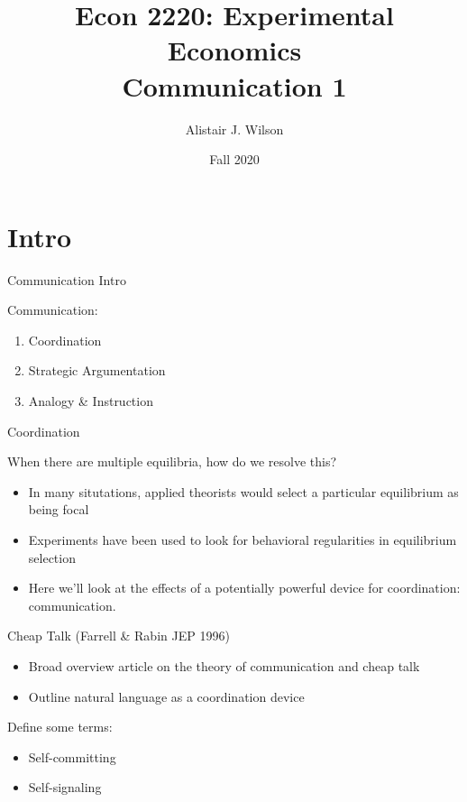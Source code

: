 \documentclass{beamer}
\begin{document}
\section{Intro}
\title{\LARGE Econ 2220: Experimental Economics \\ Communication 1}
\author{Alistair J. Wilson }
\date{Fall 2020}
 \maketitle

\begin{frame}{Communication Intro}

	\begin{card}
    Communication:
		\begin{enumerate}
			\item Coordination
			\item Strategic Argumentation
			\item Analogy \& Instruction
		\end{enumerate}
	\end{card}
\end{frame}

\begin{frame}{Coordination}
	\begin{card}
	When there are multiple equilibria, how do we resolve this?
		\begin{itemize}
			\item In many situtations, applied theorists would select a particular equilibrium as being focal
			\item Experiments have been used to look for behavioral regularities in equilibrium selection
			\item Here we'll look at the effects of a potentially powerful device for coordination: communication.
		\end{itemize}
	\end{card}
\end{frame}

\begin{frame}{Cheap Talk (Farrell \& Rabin JEP 1996)}
    \begin{card}
    	\begin{itemize}
    		\item Broad overview article on the theory of communication and cheap talk
    		\item Outline natural language as a coordination device
    	\end{itemize}
    \end{card}
    \begin{card}
	Define some terms:
		\begin{itemize}
			\item Self-committing
			\item Self-signaling
		\end{itemize}
	\end{card}
\end{frame}
\end{document}
